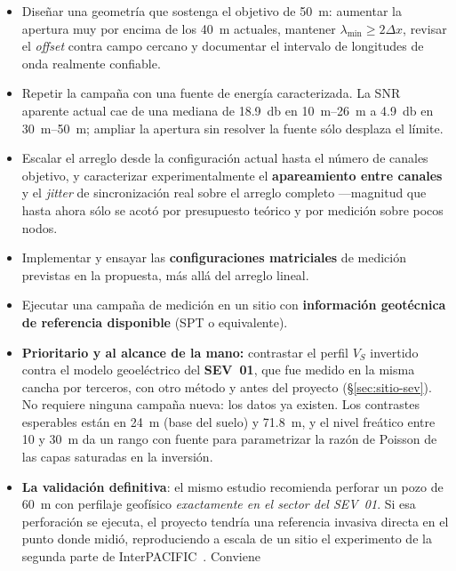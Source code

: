 \begin{itemize}[itemsep=0.15em]
    \item Dise\~nar una geometr\'ia que sostenga el objetivo de \SI{50}{\meter}: aumentar
    la apertura muy por encima de los \SI{40}{\meter} actuales, mantener
    $\lambda_{\min}\geq2\Delta x$, revisar el \emph{offset} contra campo cercano y
    documentar el intervalo de longitudes de onda realmente confiable.
    \item Repetir la campa\~na con una fuente de energ\'ia caracterizada. La SNR aparente
    actual cae de una mediana de \SI{18.9}{\decibel} en \SIrange{10}{26}{\meter} a
    \SI{4.9}{\decibel} en \SIrange{30}{50}{\meter}; ampliar la apertura sin resolver la
    fuente s\'olo desplaza el l\'imite.
    \item Escalar el arreglo desde la configuraci\'on actual hasta el n\'umero de canales
    objetivo, y caracterizar experimentalmente el \textbf{apareamiento entre canales} y
    el \emph{jitter} de sincronizaci\'on real sobre el arreglo completo ---magnitud que
    hasta ahora s\'olo se acot\'o por presupuesto te\'orico y por medici\'on sobre pocos nodos.
    \item Implementar y ensayar las \textbf{configuraciones matriciales} de medici\'on
    previstas en la propuesta, m\'as all\'a del arreglo lineal.
    \item Ejecutar una campa\~na de medici\'on en un sitio con \textbf{informaci\'on
    geot\'ecnica de referencia disponible} (SPT o equivalente).
    \item \textbf{Prioritario y al alcance de la mano:} contrastar el perfil $V_S$
    invertido contra el modelo geoel\'ectrico del \textbf{SEV~01}, que fue medido en la
    misma cancha por terceros, con otro m\'etodo y antes del proyecto
    (\S\ref{sec:sitio-sev}). No requiere ninguna campa\~na nueva: los datos ya existen.
    Los contrastes esperables est\'an en \SI{24}{\meter} (base del suelo) y
    \SI{71.8}{\meter}, y el nivel fre\'atico entre \SI{10}{} y \SI{30}{\meter} da un
    rango con fuente para parametrizar la raz\'on de Poisson de las capas saturadas en la
    inversi\'on.
    \item \textbf{La validaci\'on definitiva}: el mismo estudio recomienda perforar un
    pozo de \SI{60}{\meter} con perfilaje geof\'isico \emph{exactamente en el sector del
    SEV~01}. Si esa perforaci\'on se ejecuta, el proyecto tendr\'ia una referencia
    invasiva directa en el punto donde midi\'o, reproduciendo a escala de un sitio el
    experimento de la segunda parte de InterPACIFIC~\cite{Garofalo2016b}. Conviene

\end{itemize}
